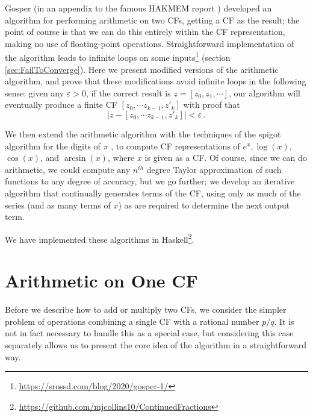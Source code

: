 \documentclass[11pt, oneside]{amsart}   	%
\renewcommand{\:}{\negthickspace:\negthickspace}
\begin{document}
Gosper (in an appendix to the famous HAKMEM report \cite{hakmem}) 
developed an algorithm for performing arithmetic on two CFs, getting a CF as the result;
the point of course is that we can do this entirely within the CF representation, making no use of floating-point operations. Straightforward implementation of the algorithm leads to infinite loops on some inputs\footnote{\href{https://srossd.com/blog/2020/gosper-1/}{https://srossd.com/blog/2020/gosper-1/}} (section \ref{sec:FailToConverge}).
Here we present modified versions of the arithmetic algorithm, and prove that these modifications avoid infinite loops in the following sense: given any $\varepsilon > 0$, if the correct result is $z=[z_0,z_1,\cdots]$, our algorithm will eventually produce a finite CF $[z_0, \cdots z_{k-1}, z'_k]$ with proof that 
\[
|z - [z_0, \cdots z_{k-1}, z'_k]| < \varepsilon\ .
\]

We then extend the arithmetic algorithm with the techniques of the spigot algorithm for the digits of $\pi$ \cite{Gibbons2016,Rabinowitz2016}, to compute CF representations of $e^x, \log(x)$,  $\cos(x)$, and $\arcsin(x)$, where $x$ is given as a CF. 
Of course, since we can do arithmetic, we could compute any $n^{th}$ degree Taylor approximation of such functions to any degree of accuracy, but we go further;
we develop an iterative algorithm that continually generates terms of the CF, using only as much of the series (and as many terms of $x$) as are required to determine the next output term.

We have implemented these algorithms
in Haskell\footnote{\href{https://github.com/mjcollins10/ContinuedFractions}{https://github.com/mjcollins10/ContinuedFractions}}.


\section{Arithmetic on One CF}
Before we describe how to add or multiply two CFs, we consider the simpler problem of operations combining a single CF with a
rational number $p/q$. It is not in fact necessary to handle this as a special case, but considering this case separately allows us to present the core idea of the algorithm in a straightforward way.
\end{document}
